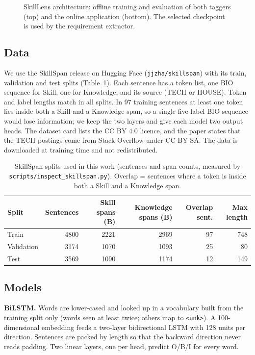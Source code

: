 \documentclass[runningheads]{llncs}
\begin{document}
\begin{figure}[t]
\centering
\resizebox{\textwidth}{!}{}
\caption{SkillLens architecture: offline training and evaluation of both taggers (top) and the
online application (bottom). The selected checkpoint is used by the requirement extractor.}
\label{fig:arch}
\end{figure}

\subsection{Data}
We use the SkillSpan release on Hugging Face (\texttt{jjzha/skillspan}) with its train, validation and
test splits (Table~\ref{tab:data}). Each sentence has a token list, one BIO sequence for Skill, one for
Knowledge, and its source (TECH or HOUSE). Token and label lengths match in all splits. In 97 training
sentences at least one token lies inside both a Skill and a Knowledge span, so a single five-label BIO
sequence would lose information; we keep the two layers and give each model two output heads. The
dataset card lists the CC BY 4.0 licence, and the paper states that the TECH postings come from Stack
Overflow under CC BY-SA. The data is downloaded at training time and not redistributed.

\begin{table}[t]
\centering
\caption{SkillSpan splits used in this work (sentences and span counts, measured by
\texttt{scripts/inspect\_skillspan.py}). Overlap = sentences where a token is inside both a Skill
and a Knowledge span.}
\label{tab:data}
\begin{tabular}{lrrrrr}
\toprule
Split & Sentences & Skill spans (B) & Knowledge spans (B) & Overlap sent. & Max length \\
\midrule
Train & 4800 & 2221 & 2969 & 97 & 748 \\
Validation & 3174 & 1070 & 1093 & 25 & 80 \\
Test & 3569 & 1090 & 1174 & 12 & 149 \\
\bottomrule
\end{tabular}
\end{table}

\subsection{Models}
\textbf{BiLSTM.} Words are lower-cased and looked up in a vocabulary built from the training split only
(words seen at least twice; others map to \texttt{<unk>}). A 100-dimensional embedding feeds a
two-layer bidirectional LSTM with 128 units per direction. Sentences are packed by length so that the
backward direction never reads padding. Two linear layers, one per head, predict O/B/I for every word.
\end{document}
